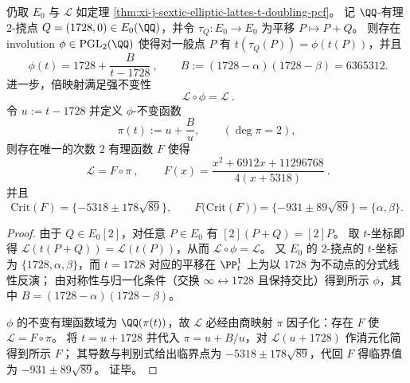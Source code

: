 \begin{theorem}\label{thm:xi-j-sextic-elliptic-lattes-degree-drop-by-2torsion}
仍取 \(E_0\) 与 \(\mathcal L\) 如定理 \ref{thm:xi-j-sextic-elliptic-lattes-t-doubling-pcf}。
记 \(\QQ\)-有理 \(2\)-挠点 \(Q=(1728,0)\in E_0(\QQ)\)，并令 \(\tau_Q:E_0\to E_0\) 为平移 \(P\mapsto P+Q\)。
则存在 involution \(\phi\in\mathrm{PGL}_2(\QQ)\) 使得对一般点 \(P\) 有 \(t(\tau_Q(P))=\phi(t(P))\)，并且
\[
\boxed{\ \phi(t)=1728+\frac{B}{t-1728}\ },
\qquad
B:=(1728-\alpha)(1728-\beta)=6365312.
\]
进一步，倍映射满足强不变性
\[
\boxed{\ \mathcal L\circ \phi=\mathcal L\ }.
\]
令 \(u:=t-1728\) 并定义 \(\phi\)-不变函数
\[
\pi(t):=u+\frac{B}{u},
\qquad (\deg\pi=2),
\]
则存在唯一的次数 \(2\) 有理函数 \(F\) 使得
\[
\boxed{\ \mathcal L = F\circ \pi\ },
\qquad
\boxed{\ F(x)=\frac{x^{2}+6912x+11296768}{4(x+5318)}\ }.
\]
并且
\[
\mathrm{Crit}(F)=\{-5318\pm 178\sqrt{89}\},
\qquad
F\bigl(\mathrm{Crit}(F)\bigr)=\{-931\pm 89\sqrt{89}\}=\{\alpha,\beta\}.
\]
\end{theorem}
\begin{proof}
由于 \(Q\in E_0[2]\)，对任意 \(P\in E_0\) 有
\(
[2](P+Q)=[2]P
\)。
取 \(t\)-坐标即得 \(\mathcal L(t(P+Q))=\mathcal L(t(P))\)，从而 \(\mathcal L\circ\phi=\mathcal L\)。
又 \(E_0\) 的 \(2\)-挠点的 \(t\)-坐标为 \(\{1728,\alpha,\beta\}\)，而 \(t=1728\) 对应的平移在 \(\PP^1_t\) 上为以 \(1728\) 为不动点的分式线性反演；
由对称性与归一化条件（交换 \(\infty\leftrightarrow 1728\) 且保持交比）得到所示 \(\phi\)，其中
\(
B=(1728-\alpha)(1728-\beta)
\)。
\par
\(\phi\) 的不变有理函数域为 \(\QQ(\pi(t))\)，故 \(\mathcal L\) 必经由商映射 \(\pi\) 因子化：存在 \(F\) 使 \(\mathcal L=F\circ\pi\)。
将 \(t=u+1728\) 并代入 \(\pi=u+B/u\)，对 \(\mathcal L(u+1728)\) 作消元化简得到所示 \(F\)；
其导数与判别式给出临界点为 \(-5318\pm 178\sqrt{89}\)，代回 \(F\) 得临界值为 \(-931\pm 89\sqrt{89}\)。
证毕。
\end{proof}

